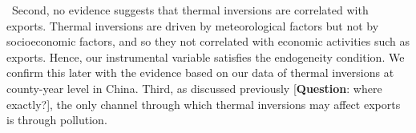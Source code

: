 \documentclass[12pt]{article}
\begin{document}
\ Second, no evidence suggests that thermal inversions are correlated with
exports. Thermal inversions are driven by meteorological factors but not by
socioeconomic factors, and so they not correlated with economic activities
such as exports. Hence, our instrumental variable satisfies the endogeneity
condition. We confirm this later with the evidence based on our data of
thermal inversions at county-year level in China. Third, as discussed
previously [\textbf{Question}: where exactly?], the only channel through
which thermal inversions may affect exports is through pollution. 

\end{document}
